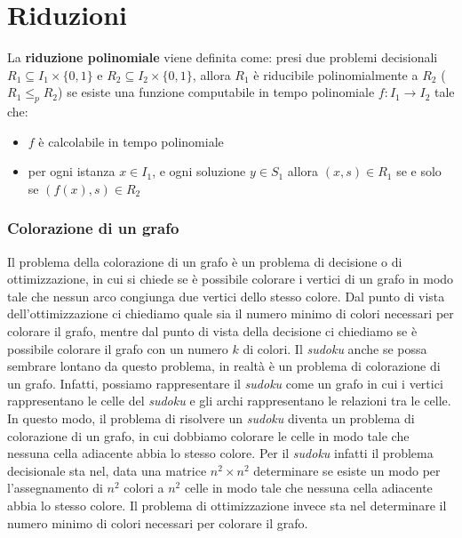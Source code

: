 \section{Riduzioni}
    La \textbf{riduzione polinomiale} viene definita come: presi due problemi decisionali $R_1\subseteq I_1\times\{0,1\}$ e $R_2\subseteq I_2\times\{0,1\}$, allora $R_1$ è riducibile polinomialmente a $R_2$ ($R_1\leq_p R_2$) se esiste una funzione computabile in tempo polinomiale $f:I_1\to I_2$ tale che:
    \begin{itemize}
        \item $f$ è calcolabile in tempo polinomiale
        \item per ogni istanza $x\in I_1$, e ogni soluzione $y\in S_1$ allora $(x,s)\in R_1$ se e solo se $(f(x),s)\in R_2$
    \end{itemize}
    \subsubsection{Colorazione di un grafo}
        Il problema della colorazione di un grafo è un problema di decisione o di ottimizzazione, in cui si chiede se è possibile colorare i vertici di un grafo in modo tale che nessun arco congiunga due vertici dello stesso colore. Dal punto di vista dell'ottimizzazione ci chiediamo quale sia il numero minimo di colori necessari per colorare il grafo, mentre dal punto di vista della decisione ci chiediamo se è possibile colorare il grafo con un numero $k$ di colori.\newline
        Il \textit{sudoku} anche se possa sembrare lontano da questo problema, in realtà è un problema di colorazione di un grafo. Infatti, possiamo rappresentare il \textit{sudoku} come un grafo in cui i vertici rappresentano le celle del \textit{sudoku} e gli archi rappresentano le relazioni tra le celle. In questo modo, il problema di risolvere un \textit{sudoku} diventa un problema di colorazione di un grafo, in cui dobbiamo colorare le celle in modo tale che nessuna cella adiacente abbia lo stesso colore. Per il \textit{sudoku} infatti il problema decisionale sta nel, data una matrice $n^2\times n^2$ determinare se esiste un modo per l'assegnamento di $n^2$ colori a $n^2$ celle in modo tale che nessuna cella adiacente abbia lo stesso colore. Il problema di ottimizzazione invece sta nel determinare il numero minimo di colori necessari per colorare il grafo.
